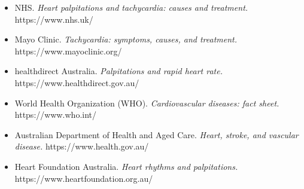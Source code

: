 \begin{itemize}
    \item NHS. \textit{Heart palpitations and tachycardia: causes and treatment.} https://www.nhs.uk/
    \item Mayo Clinic. \textit{Tachycardia: symptoms, causes, and treatment.} https://www.mayoclinic.org/
    \item healthdirect Australia. \textit{Palpitations and rapid heart rate.} https://www.healthdirect.gov.au/
    \item World Health Organization (WHO). \textit{Cardiovascular diseases: fact sheet.} https://www.who.int/
    \item Australian Department of Health and Aged Care. \textit{Heart, stroke, and vascular disease.} https://www.health.gov.au/
    \item Heart Foundation Australia. \textit{Heart rhythms and palpitations.} https://www.heartfoundation.org.au/
\end{itemize}
\clearpage
